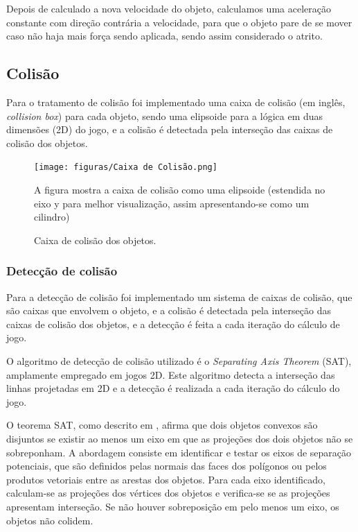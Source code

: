 Depois de calculado a nova velocidade do objeto, calculamos uma aceleração constante com direção contrária a velocidade, para que o objeto pare de se mover caso não haja mais força sendo aplicada, sendo assim considerado o atrito.

\subsection{Colisão}

Para o tratamento de colisão foi implementado uma caixa de colisão (em inglês, \textit{collision box}) para cada objeto, sendo uma elipsoide para a lógica em duas dimensões (2D) do jogo, e a colisão é detectada pela interseção das caixas de colisão dos objetos.

\begin{figure}[H]
    \centering
    \texttt{[image: figuras/Caixa de Colisão.png]}
    \caption{Caixa de colisão dos objetos.}
    \footnotesize{A figura mostra a caixa de colisão como uma elipsoide (estendida no eixo y para melhor visualização, assim apresentando-se como um cilindro)}
    \label{fig:collision-box}
\end{figure}

\subsubsection{Detecção de colisão}

Para a detecção de colisão foi implementado um sistema de caixas de colisão, que são caixas que envolvem o objeto, e a colisão é detectada pela interseção das caixas de colisão dos objetos, e a detecção é feita a cada iteração do cálculo de jogo.

O algoritmo de detecção de colisão utilizado é o \textit{Separating Axis Theorem} (SAT), amplamente empregado em jogos 2D. Este algoritmo detecta a interseção das linhas projetadas em 2D e a detecção é realizada a cada iteração do cálculo do jogo.

O teorema SAT, como descrito em \cite{SAT:separatingAxisTheorem}, afirma que dois objetos convexos são disjuntos se existir ao menos um eixo em que as projeções dos dois objetos não se sobreponham. A abordagem consiste em identificar e testar os eixos de separação potenciais, que são definidos pelas normais das faces dos polígonos ou pelos produtos vetoriais entre as arestas dos objetos. Para cada eixo identificado, calculam-se as projeções dos vértices dos objetos e verifica-se se as projeções apresentam interseção. Se não houver sobreposição em pelo menos um eixo, os objetos não colidem.

